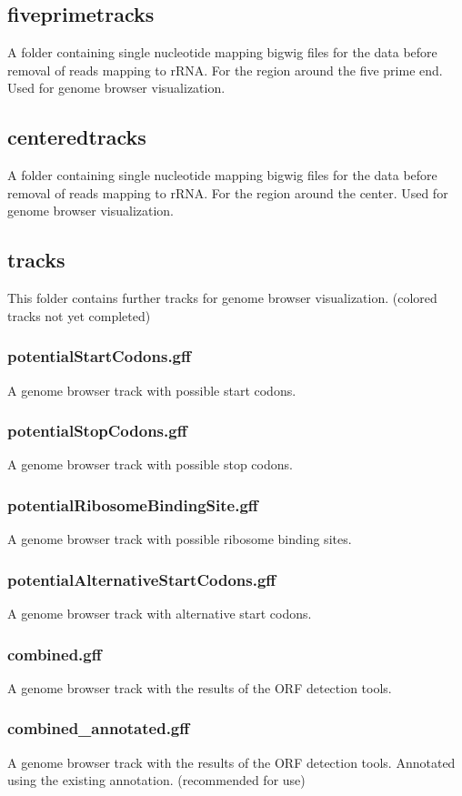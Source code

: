 \documentclass[10pt,a4paper]{article}
\begin{document}
\subsection*{fiveprimetracks}
A folder containing single nucleotide mapping bigwig files for the data before removal of reads mapping to rRNA. For the region around the five prime end. Used for genome browser visualization.
\subsection*{centeredtracks}
A folder containing single nucleotide mapping bigwig files for the data before removal of reads mapping to rRNA. For the region around the center. Used for genome browser visualization.
\subsection*{tracks}
This folder contains further tracks for genome browser visualization. (colored tracks not yet completed)
\subsubsection{potentialStartCodons.gff}
A genome browser track with possible start codons.
\subsubsection{potentialStopCodons.gff}
A genome browser track with possible stop codons.
\subsubsection{potentialRibosomeBindingSite.gff}
A genome browser track with possible ribosome binding sites.
\subsubsection{potentialAlternativeStartCodons.gff}
A genome browser track with alternative start codons.
\subsubsection{combined.gff}
A genome browser track with the results of the ORF detection tools.
\subsubsection{combined\_annotated.gff}
A genome browser track with the results of the ORF detection tools. Annotated using the existing annotation. (recommended for use)
\end{document}
